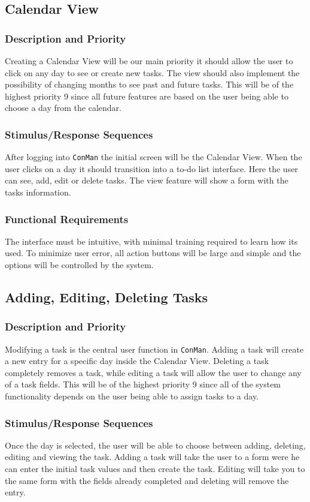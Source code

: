 \documentclass{article}
\begin{document}
\subsection{Calendar View}
\subsubsection{Description and Priority}
Creating a Calendar View will be our main priority it should allow the user to click on any day to see or create new tasks.  The view should also implement the possibility of changing months to see past and future tasks. 
This will be of the highest priority 9 since all future features are based on the user being able to choose a day from the calendar.

\subsubsection{Stimulus/Response Sequences}
After logging into \texttt{ConMan} the initial screen will be the Calendar View.  When the user clicks on a day it should transition into a to-do list interface. 
Here the user can see, add, edit or delete tasks. 
The view feature will show a form with the tasks information.

\subsubsection{Functional Requirements}
The interface must be intuitive, with minimal training required to learn how its used. 
To minimize user error, all action buttons will be large and simple and the options will be controlled by the system.

\subsection{Adding, Editing, Deleting Tasks}
\subsubsection{Description and Priority}
Modifying a task is the central user function in \texttt{ConMan}. 
Adding a task will create a new entry for a specific day inside the Calendar View. Deleting a task completely removes a task, while editing a task will allow the user to change any of a task fields. 
This will be of the highest priority 9 since all of the system functionality depends on the user being able to assign tasks to a day.
\subsubsection{Stimulus/Response Sequences}
Once the day is selected, the user will be able to choose between adding, deleting, editing and viewing the task. 
Adding a task will take the user to a form were he can enter the initial task values and then create the task. 
Editing will take you to the same form with the fields already completed and deleting will remove the entry. 
\end{document}
